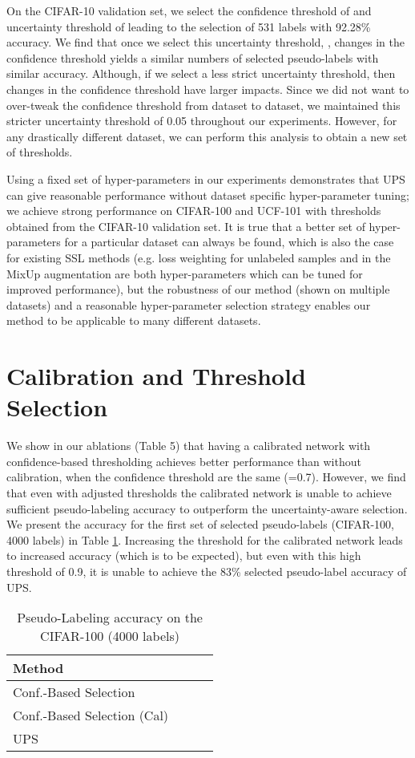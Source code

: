 \documentclass{article} \usepackage{iclr2021_conference,times}
\begin{document}
On the CIFAR-10 validation set, we select the confidence threshold of  and uncertainty threshold of  leading to the selection of 531 labels with 92.28\% accuracy. We find that once we select this uncertainty threshold, , changes in the confidence threshold yields a similar numbers of selected pseudo-labels with similar accuracy. Although, if we select a less strict uncertainty threshold, then changes in the confidence threshold have larger impacts. Since we did not want to over-tweak the confidence threshold from dataset to dataset, we maintained this stricter uncertainty threshold of 0.05 throughout our experiments. However, for any drastically different dataset, we can perform this analysis to obtain a new set of thresholds.

Using a fixed set of hyper-parameters in our experiments demonstrates that UPS can give reasonable performance without dataset specific hyper-parameter tuning; we achieve strong performance on CIFAR-100 and UCF-101 with thresholds obtained from the CIFAR-10 validation set. It is true that a better set of hyper-parameters for a particular dataset can always be found, which is also the case for existing SSL methods (e.g. loss weighting for unlabeled samples and  in the MixUp augmentation are both hyper-parameters which can be tuned for improved performance), but the robustness of our method (shown on multiple datasets) and a reasonable hyper-parameter selection strategy enables our method to be applicable to many different datasets.

\section{Calibration and Threshold Selection}

We show in our ablations (Table 5) that having a calibrated network with confidence-based thresholding achieves better performance than without calibration, when the confidence threshold are the same (=0.7). However, we find that even with adjusted thresholds the calibrated network is unable to achieve sufficient pseudo-labeling accuracy to outperform the uncertainty-aware selection. We present the accuracy for the first set of selected pseudo-labels (CIFAR-100, 4000 labels) in Table \ref{tab:diffthresh}. Increasing the threshold for the calibrated network leads to increased accuracy (which is to be expected), but even with this high threshold of 0.9, it is unable to achieve the 83\% selected pseudo-label accuracy of UPS.

\begin{table}[h]
\caption{Pseudo-Labeling accuracy on the CIFAR-100 (4000 labels)}
\label{tab:diffthresh}
\centering
\small
\begin{tabular}{l|ccc}
\hline
Method &  &  &  \\ \hline
Conf.-Based Selection &  &  &  \\
Conf.-Based Selection (Cal) &  &  &  \\
UPS &  &  &  \\
 
\hline
\end{tabular}
\end{table}
\end{document}
